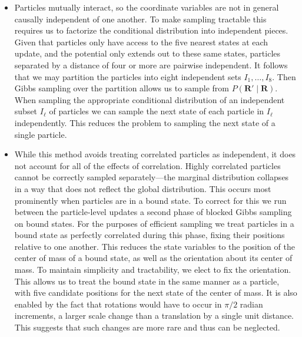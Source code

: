 \documentclass[12pt,letterpaper]{article}
\newcommand{\mb}{\mathbf}
\begin{document}
\begin{itemize}
\begin{align*}
P(\mb{R}') = \sum_{\mb{S}}P(\mb{R}' \mid \mb{S})P(\mb{R} = \mb{S})
\end{align*}
which reduces to
\begin{align*}
P(\mb{R}') = P(\mb{R}' \mid \mb{R})
\end{align*}
upon fixing $\mb{R}$. So we must determine the conditional next state distribution $P(\mb{R}' \mid \mb{R})$.
\item Particles mutually interact, so the coordinate variables are not in general causally independent of one another. To make sampling tractable this requires us to factorize the conditional distribution into independent pieces. Given that particles only have access to the five nearest states at each update, and the potential only extends out to these same states, particles separated by a distance of four or more are pairwise independent. It follows that we may partition the particles into eight independent sets $I_{1}, \ldots, I_{8}$. Then Gibbs sampling over the partition allows us to sample from $P(\mb{R}' \mid \mb{R})$. When sampling the appropriate conditional distribution of an independent subset $I_{\ell}$ of particles we can sample the next state of each particle in $I_{\ell}$ independently. This reduces the problem to sampling the next state of a single particle.
\item While this method avoids treating correlated particles as independent, it does not account for all of the effects of correlation. Highly correlated particles cannot be correctly sampled separately---the marginal distribution collapses in a way that does not reflect the global distribution. This occurs most prominently when particles are in a bound state. To correct for this we run between the particle-level updates a second phase of blocked Gibbs sampling on bound states. For the purposes of efficient sampling we treat particles in a bound state as perfectly correlated during this phase, fixing their positions relative to one another. This reduces the state variables to the position of the center of mass of a bound state, as well as the orientation about its center of mass. To maintain simplicity and tractability, we elect to fix the orientation. This allows us to treat the bound state in the same manner as a particle, with five candidate positions for the next state of the center of mass. It is also enabled by the fact that rotations would have to occur in $\pi/2$ radian increments, a larger scale change than a translation by a single unit distance. This suggests that such changes are more rare and thus can be neglected.

\end{itemize}
\end{document}

